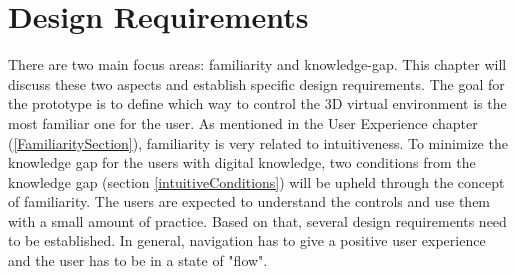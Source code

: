 \section{Design Requirements}\label{DesignRequirements}
There are two main focus areas: familiarity and knowledge-gap. This chapter will discuss these two aspects and establish specific design requirements. 
The goal for the prototype is to define which way to control the 3D virtual environment is the most familiar one for the user. As mentioned in the User Experience chapter (\ref{FamiliaritySection}), familiarity is very related to intuitiveness.
To minimize the knowledge gap for the users with digital knowledge, two conditions from the knowledge gap (section \ref{intuitiveConditions}) will be upheld through the concept of familiarity. The users are expected to understand the controls and use them with a small amount of practice. Based on that, several design requirements need to be established. In general, navigation has to give a positive user experience and the user has to be in a state of "flow". 

